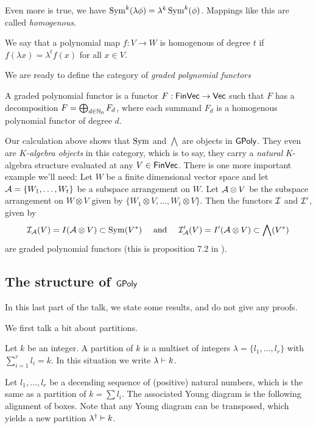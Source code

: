 \documentclass[../main.tex]{subfiles}
\begin{document}
Even more is true, we have $\operatorname{Sym}^k(\lambda \phi) = \lambda^k \operatorname{Sym}^k(\phi)$. 
Mappings like this are called \emph{homogenous}.
\begin{defi}
    We say that a polynomial map $f: V \to W$ is homogenous of degree $t$ if
    $f(\lambda x) = \lambda^t f(x)$ for all $x \in V$.
\end{defi}

We are ready to define the category of \emph{graded polynomial functors}

\begin{defi}
    A graded polynomial functor is a functor $F: \textnormal{$\textsf{FinVec}$} \to \textnormal{$\textsf{Vec}$}$ such that 
    $F$ has a decomposition $F = \bigoplus_{d \in \mathbb{N}_0} F_d$, where 
    each summand $F_d$ is a homogenous polynomial functor of degree $d$.
\end{defi}

Our calculation above shows that $\operatorname{Sym}$ and $\bigwedge$ are objects in $\textnormal{$\textsf{GPoly}$}$. 
They even are \emph{$K$-algebra objects} in this category, which is to say, they 
carry a \emph{natural} $K$-algebra structure evaluated at any $V \in \textnormal{$\textsf{FinVec}$}$.
There is one more important example we'll need: Let $W$ be a finite dimensional vector
space and let $\mathcal{A} = \{W_1,\dots, W_t\}$ be a subspace arrangement on $W$. Let
$\mathcal{A} \otimes V$ be the subspace arrangement on $W \otimes V$ given by 
$\{W_1 \otimes V, \dots, W_t \otimes V\}$. Then the functors $\mathcal{I}$ and $\mathcal{I}'$, given by
\begin{equation*}
    \mathcal{I}_{\mathcal{A}}(V) = I(\mathcal{A} \otimes V) \subset \operatorname{Sym}(V^*) \quad \text{ and } \quad
    \mathcal{I}'_{\mathcal{A}}(V) = I'(\mathcal{A} \otimes V) \subset \bigwedge(V^*)
\end{equation*}
are graded polynomial functors (this is proposition 7.2 in 
\cite{Gandini2019ResOfIdeals}). 

\subsection{The structure of $\textnormal{$\textsf{GPoly}$}$}
In this last part of the talk, we state some results, and do not give any proofs.

We first talk a bit about partitions.
\begin{defi}[Partition]
    Let $k$ be an integer. A partition of $k$ is a multiset of integers
    $\lambda = \{l_1, \dots, l_r\}$ with $\sum_{i = 1}^r l_i = k$. In this 
    situation we write $\lambda \vdash k$.
\end{defi}
\begin{defi}
    Let $l_1, \dots, l_r$ be a decending sequence of (positive) natural numbers,
    which is the same as a partition of $k = \sum l_i$. The associated Young diagram
    is the following alignment of boxes.
    Note that any Young diagram can be transposed, which yields a new partition
    $\lambda^\dagger \vdash k$.
\end{defi}
\end{document}
